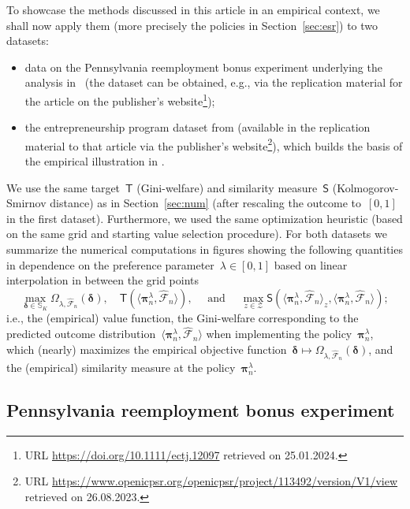 \documentclass[11pt, a4paper]{article}
\theoremstyle{definition}
\begin{document}
To showcase the methods discussed in this article in an empirical context, we shall now apply them (more precisely the policies in Section~\ref{sec:esr}) to two datasets:
%
\begin{itemize}
\item data on the Pennsylvania reemployment bonus experiment underlying the analysis in~\cite{bilias} (the dataset can be obtained, e.g., via the replication material for the article \cite{1ddml} on the publisher's website\footnote{URL \url{https://doi.org/10.1111/ectj.12097} retrieved on 25.01.2024.});
\item the entrepreneurship program dataset from \cite{lyonszhang} (available in the replication material to that article via the publisher's website\footnote{URL \url{https://www.openicpsr.org/openicpsr/project/113492/version/V1/view} retrieved on 26.08.2023.}), which builds the basis of the empirical illustration in \cite{vivbra}.
\end{itemize}
%
We use the same target~$\mathsf{T}$ (Gini-welfare) and similarity measure~$\mathsf{S}$ (Kolmogorov-Smirnov distance) as in Section~\ref{sec:num} (after rescaling the outcome to~$[0, 1]$ in the first dataset). Furthermore, we used the same optimization heuristic (based on the same grid and starting value selection procedure). For both datasets we summarize the numerical computations in figures showing the following quantities in dependence on the preference parameter~$\lambda \in [0, 1]$ based on linear interpolation in between the grid points
%
\begin{equation}\label{eqn:empirics_functions}
\max_{\bm{\delta} \in \mathbb{S}_K} \Omega_{\lambda, \hat{\mathcal{F}}_n}(\bm{\delta}), \quad \mathsf{T}\left( \langle \bm{\pi}_n^{\lambda}, \hat{\mathcal{F}}_n \rangle \right), \quad \text{ and } \quad \max_{z \in \mathcal{Z}}\mathsf{S}\left( \langle \bm{\pi}_n^{\lambda}, \hat{\mathcal{F}}_n \rangle_z, \langle \bm{\pi}_n^{\lambda}, \hat{\mathcal{F}}_n \rangle \right);
\end{equation}
%
i.e., the (empirical) value function, the Gini-welfare corresponding to the predicted outcome distribution~$\langle \bm{\pi}_n^{\lambda}, \hat{\mathcal{F}}_n \rangle$ when implementing the policy~$\bm{\pi}_n^{\lambda}$, which (nearly) maximizes the empirical objective function~$\bm{\delta} \mapsto \Omega_{\lambda, \hat{\mathcal{F}}_n}(\bm{\delta})$, and the (empirical) similarity measure at the policy~$\bm{\pi}_n^{\lambda}$. 

\subsection{Pennsylvania reemployment bonus experiment}
\end{document}
